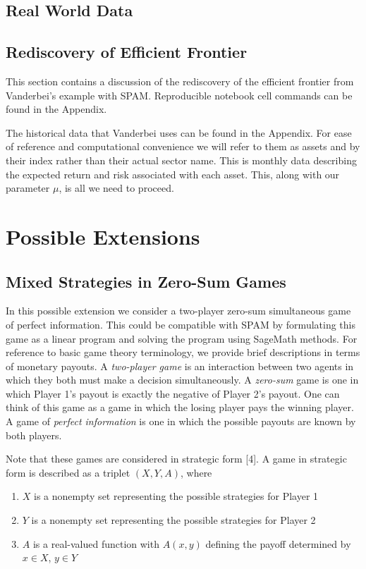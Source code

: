 \documentclass{article}
\begin{document}
\subsection{Real World Data}



\subsection{Rediscovery of Efficient Frontier}

This section contains a discussion of the rediscovery of the efficient frontier from Vanderbei's example with SPAM. Reproducible notebook cell commands can be found in the Appendix. 

The historical data that Vanderbei uses can be found in the Appendix. For ease of reference and computational convenience we will refer to them as assets and by their index rather than their actual sector name. This is monthly data describing the expected return and risk associated with each asset. This, along with our parameter $\mu$, is all we need to proceed. 


\section{Possible Extensions}

\subsection{Mixed Strategies in Zero-Sum Games}

In this possible extension we consider a two-player zero-sum simultaneous game of perfect information. This could be compatible with SPAM by formulating this game as a linear program and solving the program using SageMath methods. For reference to basic game theory terminology, we provide brief descriptions in terms of monetary payouts. A \textit{two-player game} is an interaction between two agents in which they both must make a decision simultaneously. A \textit{zero-sum} game is one in which Player 1's payout is exactly the negative of Player 2's payout. One can think of this game as a game in which the losing player pays the winning player. A game of \textit{perfect information} is one in which the possible payouts are known by both players. 

Note that these games are considered in strategic form [4]. A game in strategic form is described as a triplet $(X,Y,A)$, where
\begin{enumerate}
    \item $X$ is a nonempty set representing the possible strategies for Player 1
    \item $Y$ is a nonempty set representing the possible strategies for Player 2
    \item $A$ is a real-valued function with $A(x, y)$ defining the payoff determined by $x \in X$, $y \in Y$
\end{enumerate}
\end{document}
